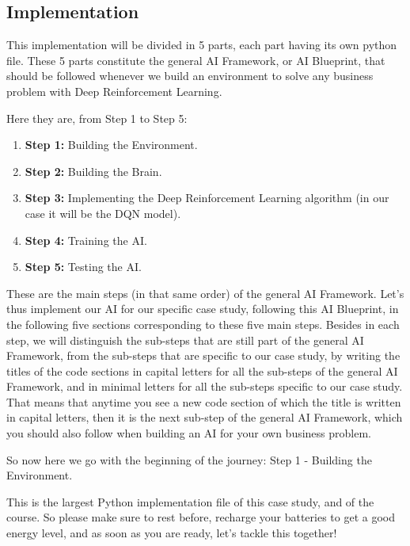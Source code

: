 \documentclass[]{book}
\begin{document}
\newpage

\subsection{Implementation}

This implementation will be divided in 5 parts, each part having its own python file. These 5 parts constitute the general AI Framework, or AI Blueprint, that should be followed whenever we build an environment to solve any business problem with Deep Reinforcement Learning.

Here they are, from Step 1 to Step 5:

\begin{enumerate}
    \item \textbf{Step 1:} Building the Environment.
    \
    \item \textbf{Step 2:} Building the Brain.
    \
    \item \textbf{Step 3:} Implementing the Deep Reinforcement Learning algorithm (in our case it will be the DQN model).
    \
    \item \textbf{Step 4:} Training the AI.
    \
    \item \textbf{Step 5:} Testing the AI.
\end{enumerate}

These are the main steps (in that same order) of the general AI Framework. Let's thus implement our AI for our specific case study, following this AI Blueprint, in the following five sections corresponding to these five main steps. Besides in each step, we will distinguish the sub-steps that are still part of the general AI Framework, from the sub-steps that are specific to our case study, by writing the titles of the code sections in capital letters for all the sub-steps of the general AI Framework, and in minimal letters for all the sub-steps specific to our case study. That means that anytime you see a new code section of which the title is written in capital letters, then it is the next sub-step of the general AI Framework, which you should also follow when building an AI for your own business problem.

So now here we go with the beginning of the journey: Step 1 - Building the Environment.

This is the largest Python implementation file of this case study, and of the course. So please make sure to rest before, recharge your batteries to get a good energy level, and as soon as you are ready, let's tackle this together!
\end{document}
